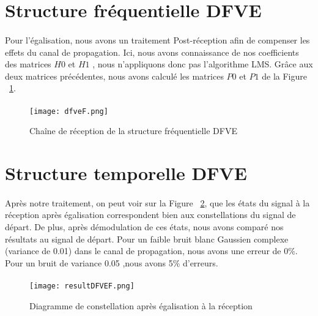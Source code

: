 \section{Structure fréquentielle DFVE}

\paragraph{}
Pour l'égalisation, nous avons un traitement Post-réception afin de compenser les effets du canal de propagation. Ici, nous avons connaissance de nos coefficients des matrices $H0$ et $H1$ \cite{sujet}, nous n'appliquons donc pas l'algorithme LMS. Grâce aux deux matrices précédentes, nous avons calculé les matrices $P0$ et $P1$ de la Figure ~\ref{dfveF}.

\paragraph{}
\vspace{1\baselineskip}
\begin{figure}[!h]
  \centering
  \texttt{[image: dfveF.png]}
  \caption{Chaîne de réception de la structure fréquentielle DFVE}
	\label{dfveF} 
\end{figure}
\vspace{1\baselineskip}
\section{Structure temporelle DFVE}

\paragraph{}
Après notre traitement, on peut voir sur la Figure ~\ref{resultDFVEF}, que les états du signal à la réception après égalisation correspondent bien aux constellations du signal de départ. De plus, après démodulation de ces états, nous avons comparé nos résultats au signal de départ. Pour un faible bruit blanc Gaussien complexe (variance de 0.01) dans le canal de propagation, nous avons une erreur de 0\%. Pour un bruit de variance 0.05 ,nous avons 5\% d'erreurs.

\paragraph{}
\vspace{1\baselineskip}
\begin{figure}[!h]
  \centering
  \texttt{[image: resultDFVEF.png]}
  \caption{Diagramme de constellation après égalisation à la réception}
	\label{resultDFVEF} 
\end{figure}
\vspace{1\baselineskip}

